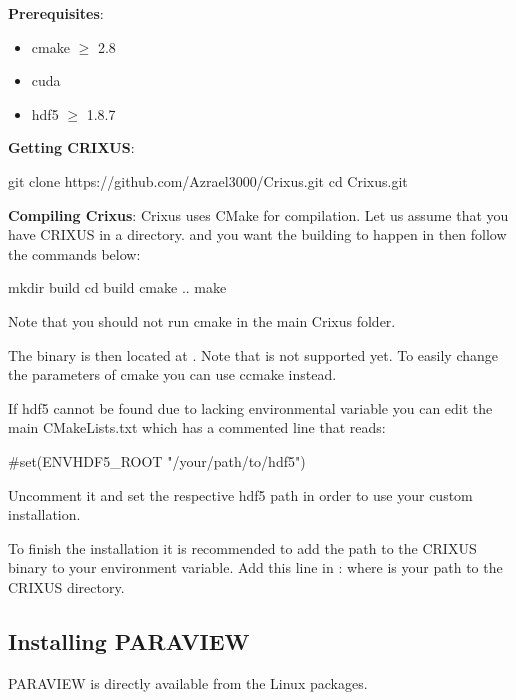 \documentclass{../GPUSPHtemplate}
\begin{document}
\textbf{Prerequisites}:
\begin{itemize}
\item cmake $\ge$ 2.8
\item cuda
\item hdf5 $\ge$ 1.8.7
\end{itemize}

\textbf{Getting CRIXUS}:
\begin{shellcode}
git clone https://github.com/Azrael3000/Crixus.git
cd Crixus.git
\end{shellcode}

\textbf{Compiling Crixus}:
Crixus uses CMake for compilation. 
Let us assume that you have CRIXUS in a  directory. 
and you want the building to happen in  then follow the commands below:
\begin{shellcode}
mkdir build
cd build
cmake ..
make
\end{shellcode}
Note that you should not run cmake in the main Crixus folder.

The binary is then located at .
Note that  is not supported yet. To easily change the parameters of cmake you can use ccmake instead.

If hdf5 cannot be found due to lacking environmental variable you can edit the main CMakeLists.txt which has a commented line that reads:
\begin{shellcode}
#set(ENV{HDF5_ROOT} "/your/path/to/hdf5")
\end{shellcode}
Uncomment it and set the respective hdf5 path in order to use your custom installation.

To finish the installation it is recommended to add the path to the CRIXUS binary to your
 environment variable. Add this line in :
where  is your path to the CRIXUS directory.

\subsection{Installing PARAVIEW}

PARAVIEW is directly available from the Linux packages.

\newpage
\appendixpage
\appendix



\end{document}
